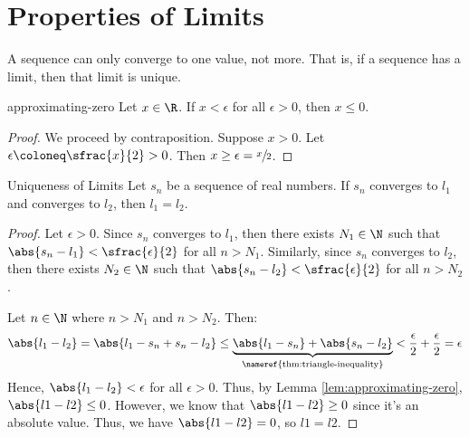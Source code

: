 \section{Properties of Limits}

A sequence can only converge to one value, not more. That is, if a sequence has a limit, then that limit is unique.

\begin{lembox}{}{approximating-zero}
    Let $x \in \R$. If $x < \epsilon$ for all $\epsilon > 0$, then $x \leq 0$.
    \tcblower
    \begin{proof}
        We proceed by contraposition. Suppose $x > 0$. Let $\epsilon \coloneq \sfrac{x}{2} > 0$. Then $x \geq \epsilon = \sfrac{x}{2}$.
    \end{proof}
\end{lembox}

\begin{thmbox}{Uniqueness of Limits}{}
    Let $s_n$ be a sequence of real numbers. If $s_n$ converges to $l_1$ and converges to $l_2$, then $l_1 = l_2$.
    \tcblower
    \begin{proof}
        Let $\epsilon > 0$. Since $s_n$ converges to $l_1$, then there exists $N_1 \in \N$ such that $\abs{s_n - l_1} < \sfrac{\epsilon}{2}$ for all $n > N_1$. Similarly, since $s_n$ converges to $l_2$, then there exists $N_2 \in \N$ such that $\abs{s_n - l_2} < \sfrac{\epsilon}{2}$ for all $n > N_2$.

        Let $n \in \N$ where $n > N_1$ and $n > N_2$. Then:
        \[ \abs{l_1 - l_2} = \abs{l_1 - s_n + s_n - l_2} \leq \underbrace{\abs{l_1 - s_n} + \abs{s_n - l_2}}_\text{\nameref{thm:triangle-inequality}} < {\frac{\epsilon}{2} + \frac{\epsilon}{2}} = \epsilon \]
        Hence, $\abs{l_1 - l_2} < \epsilon$ for all $\epsilon > 0$. Thus, by Lemma \ref{lem:approximating-zero}, $\abs{l1-l2} \leq 0$. However, we know that $\abs{l1-l2} \geq 0$ since it's an absolute value. Thus, we have $\abs{l1-l2} = 0$, so $l1 = l2$.
    \end{proof}
\end{thmbox}




